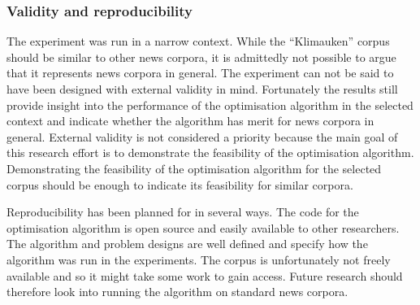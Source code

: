 \subsubsection{Validity and reproducibility}
The experiment was run in a narrow context. While the ``Klimauken'' corpus should be similar to other news corpora, it is admittedly not possible to argue that it represents news corpora in general. The experiment can not be said to have been designed with external validity in mind. Fortunately the results still provide insight into the performance of the optimisation algorithm in the selected context and indicate whether the algorithm has merit for news corpora in general. External validity is not considered a priority because the main goal of this research effort is to demonstrate the feasibility of the optimisation algorithm. Demonstrating the feasibility of the optimisation algorithm for the selected corpus should be enough to indicate its feasibility for similar corpora.

Reproducibility has been planned for in several ways. The code for the optimisation algorithm is open source and easily available to other researchers. The algorithm and problem designs are well defined and specify how the algorithm was run in the experiments. The corpus is unfortunately not freely available and so it might take some work to gain access. Future research should therefore look into running the algorithm on standard news corpora.
